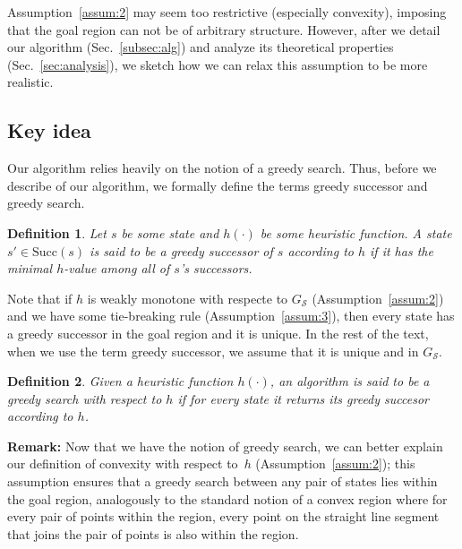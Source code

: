 \documentclass[letterpaper]{article} %
\newcommand{\calS}{\ensuremath{\mathcal{S}}\xspace}
\newtheorem{definition}{Definition}
\begin{document}
Assumption~\ref{assum:2} may seem too restrictive (especially convexity), imposing that the goal region can not be of arbitrary structure. However, after we detail our algorithm (Sec.~\ref{subsec:alg}) and analyze its theoretical properties (Sec.~\ref{sec:analysis}), we sketch how we can relax this assumption to be more realistic.


 
\subsection{Key idea}
\label{sec:key}
Our algorithm relies heavily on the notion of a greedy search.  Thus, before we describe of our algorithm, we formally define the terms greedy successor and greedy search.

\vspace{2mm}
\begin{definition}
\label{def:greedy-suc}
	Let $s$ be some state and $h(\cdot)$ be some heuristic function.
	A state $s' \in \text{Succ}(s)$ is said to be a \emph{greedy} successor of $s$ according to $h$ if it has the minimal $h$-value among all of $s$'s successors.
\end{definition}
Note that 
if $h$ is weakly monotone with respecte to $G_\calS$
(Assumption~\ref{assum:2}) 
and we have some tie-breaking rule
(Assumption~\ref{assum:3}), then every state has a greedy successor in the goal region and it is unique.  
In the rest of the text, when we use the term greedy successor, we assume that it is unique and in $G_\calS$.

\vspace{2mm}
\begin{definition}
	Given a heuristic function $h(\cdot)$,
	an algorithm is said to be a \emph{greedy search}	 with respect to $h$ if for every state it returns its greedy succesor according to $h$.
\end{definition}

\textbf{Remark:} Now that we have the notion of greedy search, we can better explain our definition of convexity with respect to~$h$ (Assumption~\ref{assum:2});
this assumption ensures that a greedy search between any pair of states lies within the goal region, analogously to the standard notion of a convex   region where for every pair of points within the region, every point on the straight line segment that joins the pair of points is also within the region.
\end{document}
